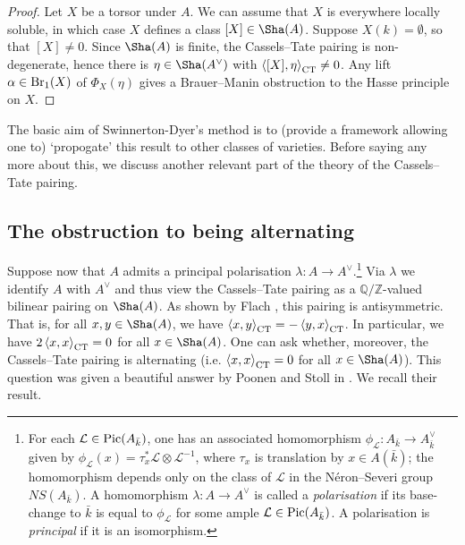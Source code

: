\documentclass[10pt]{amsart}
\numberwithin{equation}{section}
\theoremstyle{remark}
\theoremstyle{definition}
\theoremstyle{definition}
\theoremstyle{definition}
\theoremstyle{definition}
\theoremstyle{definition}
\theoremstyle{definition}
\theoremstyle{definition}
\theoremstyle{definition}
\begin{document}
\begin{proof}
Let $X$ be a torsor under $A$. We can assume that $X$ is everywhere locally soluble, in which case $X$ defines a class $[X]\in \Sha(A)$. Suppose $X(k)=\emptyset$, so that $[X]\neq 0$. Since $\Sha(A)$ is finite, the Cassels--Tate pairing is non-degenerate, hence there is $\eta\in \Sha(A^\vee)$ with $\left \langle [X],\eta\right \rangle_{\textup{CT}}\neq 0$. Any lift $\alpha \in \textup{Br}_1(X)$ of $\Phi_X(\eta)$  gives a Brauer--Manin obstruction to the Hasse principle on $X$.
\end{proof}

The basic aim of Swinnerton-Dyer's method   is  to (provide a framework allowing one to)  `propogate' this result to other classes of varieties.  Before saying any more about this, we discuss another relevant part of the theory of the Cassels--Tate pairing.

\subsection{The obstruction to being alternating}

Suppose now that $A$ admits a principal polarisation $\lambda:A \to A^\vee$.\footnote{For each $\mathcal{L}\in \textup{Pic}(A_{\bar{k}})$, one has an associated homomorphism $\phi_{\mathcal{L}}:A_{\bar{k}}\to A_{\bar{k}}^{\vee}$ given by $\phi_{\mathcal{L}}(x)=\tau_{x}^*\mathcal{L}\otimes \mathcal{L}^{-1}$, where $\tau_x$ is translation by $x\in A(\bar{k})$; the homomorphism depends only on the class of $\mathcal{L}$ in the N\'{e}ron--Severi group $NS(A_{\bar{k}})$. A homomorphism $\lambda:A\to A^\vee$ is called a \textit{polarisation} if its base-change to $\bar{k}$ is equal to $\phi_\mathcal{L}$ for some ample $\mathcal{L}\in \textup{Pic}(A_{\bar{k}})$. A polarisation is \textit{principal} if it is an isomorphism.} Via $\lambda$ we identify $A$ with $A^\vee$ and thus view the Cassels--Tate pairing as a $\mathbb{Q}/\mathbb{Z}$-valued bilinear pairing on $\Sha(A)$. As shown by Flach \cite{Fla90}, this pairing is antisymmetric. That is, for all $x,y\in \Sha(A)$, we have $\left \langle x,y\right \rangle_{\textup{CT}}=-\left \langle y,x\right \rangle_{\textup{CT}}$. In particular, we have $2\left \langle x,x\right \rangle_{\textup{CT}}=0$ for all $x\in \Sha(A)$. One can ask whether, moreover, the Cassels--Tate pairing is alternating (i.e.   $\left \langle x,x\right \rangle_{\textup{CT}}=0$ for all $x\in \Sha(A)$). This question was given a beautiful answer by Poonen and Stoll in \cite{MR1740984}. We recall their result. %
\end{document}
